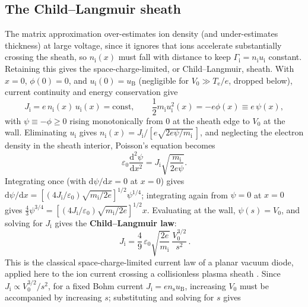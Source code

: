 \subsection{The Child--Langmuir sheath}

The matrix approximation over-estimates ion density (and under-estimates thickness) at large voltage, since it ignores that ions accelerate substantially crossing the sheath, so $n_{\mathrm{i}}(x)$ must fall with distance to keep $\Gamma_{\mathrm{i}} = n_{\mathrm{i}} u_{\mathrm{i}}$ constant. Retaining this gives the space-charge-limited, or Child--Langmuir, sheath. With $x=0$, $\phi(0)=0$, and $u_{\mathrm{i}}(0)=u_{\mathrm{B}}$ (negligible for $V_0 \gg T_{\mathrm{e}}/e$, dropped below), current continuity and energy conservation give
\begin{equation}
J_{\mathrm{i}} = e\, n_{\mathrm{i}}(x)\, u_{\mathrm{i}}(x) = \text{const}, \qquad \frac{1}{2} m_{\mathrm{i}} u_{\mathrm{i}}^{2}(x) = -e\phi(x) \equiv e\,\psi(x),
\end{equation}
with $\psi \equiv -\phi \ge 0$ rising monotonically from $0$ at the sheath edge to $V_{0}$ at the wall. Eliminating $u_{\mathrm{i}}$ gives $n_{\mathrm{i}}(x) = J_{\mathrm{i}} / [e \sqrt{2e\psi/m_{\mathrm{i}}}\,]$, and neglecting the electron density in the sheath interior, Poisson's equation becomes
\begin{equation}
\varepsilon_{0} \frac{\mathrm{d}^{2}\psi}{\mathrm{d}x^{2}} = J_{\mathrm{i}} \sqrt{\frac{m_{\mathrm{i}}}{2 e \psi}}.
\label{eq:cl-ode}
\end{equation}
Integrating once (with $\mathrm{d}\psi/\mathrm{d}x=0$ at $x=0$) gives $\mathrm{d}\psi/\mathrm{d}x = \left[ (4 J_{\mathrm{i}}/\varepsilon_{0}) \sqrt{m_{\mathrm{i}}/2e} \right]^{1/2} \psi^{1/4}$; integrating again from $\psi=0$ at $x=0$ gives $\tfrac{4}{3}\psi^{3/4} = \left[ (4J_{\mathrm{i}}/\varepsilon_{0})\sqrt{m_{\mathrm{i}}/2e} \right]^{1/2} x$. Evaluating at the wall, $\psi(s)=V_{0}$, and solving for $J_{\mathrm{i}}$ gives the \textbf{Child--Langmuir law}:
\begin{equation}
\boxed{\, J_{\mathrm{i}} = \frac{4}{9}\, \varepsilon_{0} \sqrt{\frac{2e}{m_{\mathrm{i}}}}\, \frac{V_{0}^{3/2}}{s^{2}} \,}.
\label{ch03-eq:child-langmuir}
\end{equation}
This is the classical space-charge-limited current law of a planar vacuum diode, applied here to the ion current crossing a collisionless plasma sheath \cite{ref0012,ref0024}. Since $J_{\mathrm{i}} \propto V_{0}^{3/2}/s^{2}$, for a fixed Bohm current $J_{\mathrm{i}} = e n_{\mathrm{s}} u_{\mathrm{B}}$, increasing $V_{0}$ must be accompanied by increasing $s$; substituting and solving for $s$ gives

